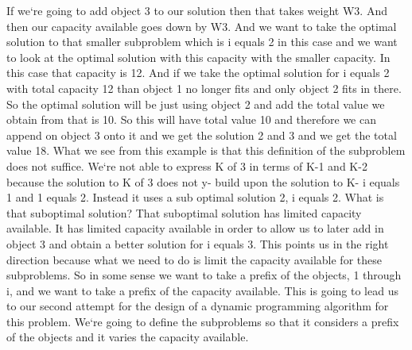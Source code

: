 If we`re going to add object 3 to our solution then that takes weight W3.
And then our capacity available goes down by W3.
And we want to take the optimal solution to that smaller subproblem which is i equals 2 in this case and we want to look at the optimal solution with this capacity with the smaller capacity.
In this case that capacity is 12.
And if we take the optimal solution for i equals 2 with total capacity 12 than object 1 no longer fits and only object 2 fits in there.
So the optimal solution will be just using object 2 and add the total value we obtain from that is 10.
So this will have total value 10 and therefore we can append on object 3 onto it and we get the solution 2 and 3 and we get the total value 18.
What we see from this example is that this definition of the subproblem does not suffice.
We`re not able to express K of 3 in terms of K-1 and K-2 because the solution to K of 3 does not y- build upon the solution to K- i equals 1 and 1 equals 2.
Instead it uses a sub optimal solution 2, i equals 2.
What is that suboptimal solution? That suboptimal solution has limited capacity available.
It has limited capacity available in order to allow us to later add in object 3 and obtain a better solution for i equals 3.
This points us in the right direction because what we need to do is limit the capacity available for these subproblems.
So in some sense we want to take a prefix of the objects, 1 through i, and we want to take a prefix of the capacity available.
This is going to lead us to our second attempt for the design of a dynamic programming algorithm for this problem.
We`re going to define the subproblems so that it considers a prefix of the objects and it varies the capacity available.

